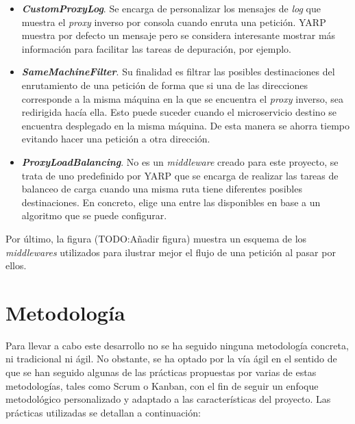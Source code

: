\documentclass[11pt,spanish,listoffigures]{tfgetsinf}
\begin{document}
\begin{itemize}

	\item \textbf{\emph{CustomProxyLog}}. Se encarga de personalizar los mensajes de \emph{log} que muestra el \emph{proxy} inverso por consola cuando enruta una petición. YARP muestra por defecto un mensaje pero se considera interesante mostrar más información para facilitar las tareas de depuración, por ejemplo.

	\item \textbf{\emph{SameMachineFilter}}. Su finalidad es filtrar las posibles destinaciones del enrutamiento de una petición de forma que si una de las direcciones corresponde a la misma máquina en la que se encuentra el \emph{proxy} inverso, sea redirigida hacía ella. Esto puede suceder cuando el microservicio destino se encuentra desplegado en la misma máquina. De esta manera se ahorra tiempo evitando hacer una petición a otra dirección.

	\item \textbf{\emph{ProxyLoadBalancing}}. No es un \emph{middleware} creado para este proyecto, se trata de uno predefinido por YARP que se encarga de realizar las tareas de balanceo de carga cuando una misma ruta tiene diferentes posibles destinaciones. En concreto, elige una entre las disponibles en base a un algoritmo que se puede configurar.

\end{itemize}

Por último, la figura (TODO:Añadir figura) muestra un esquema de los \emph{middlewares} utilizados para ilustrar mejor el flujo de una petición al pasar por ellos.



	\section{Metodología} \label{metodologia}

Para llevar a cabo este desarrollo no se ha seguido ninguna metodología concreta, ni tradicional ni ágil. No obstante, se ha optado por la vía ágil en el sentido de que se han seguido algunas de las prácticas propuestas por varias de estas metodologías, tales como Scrum o Kanban, con el fin de seguir un enfoque metodológico personalizado y adaptado a las características del proyecto. Las prácticas utilizadas se detallan a continuación:
\end{document}
